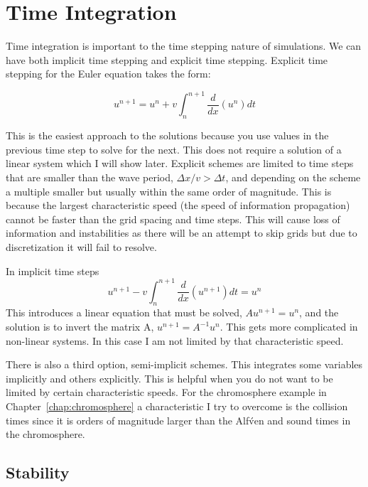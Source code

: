 \documentclass[12pt,upcase]{umlthesis}
\begin{document}
\section{Time Integration}\label{sec:timeintegration}

Time integration is important to the time stepping nature of simulations. We can have both implicit time stepping and explicit time stepping. Explicit time stepping for the Euler equation takes the form:

\begin{equation}\label{eq:explicit}
	u^{n+1} = u^n + v\int^{n+1}_n \frac{d}{dx}(u^{n}) dt
\end{equation}

This is the easiest approach to the solutions because you use values in the previous time step to solve for the next. This does not require a solution of a linear system which I will show later. Explicit schemes are limited to time steps that are smaller than the wave period, $\Delta x / v > \Delta t$, and depending on the scheme a multiple smaller but usually within the same order of magnitude. This is because the largest characteristic speed (the speed of information propagation) cannot be faster than the grid spacing and time steps. This will cause loss of information and instabilities as there will be an attempt to skip grids but due to discretization it will fail to resolve.

In implicit time steps
\begin{equation}\label{eq:implicit}
	u^{n+1} - v\int^{n+1}_n \frac{d}{dx}(u^{n+1}) dt = u^n 
\end{equation}
This introduces a linear equation that must be solved, $Au^{n+1} = u^n$, and the solution is to invert the matrix A, $u^{n+1} = A^{-1} u^n$. This gets more complicated in non-linear systems. In this case I am not limited by that characteristic speed.

There is also a third option, semi-implicit schemes. This integrates some variables implicitly and others explicitly. This is helpful when you do not want to be limited by certain characteristic speeds. For the chromosphere example in Chapter~\ref{chap:chromosphere} a characteristic I try to overcome is the collision times since it is orders of magnitude larger than the Alf\'ven and sound times in the chromosphere.

\subsection{Stability}\label{sec:stability}
\end{document}
